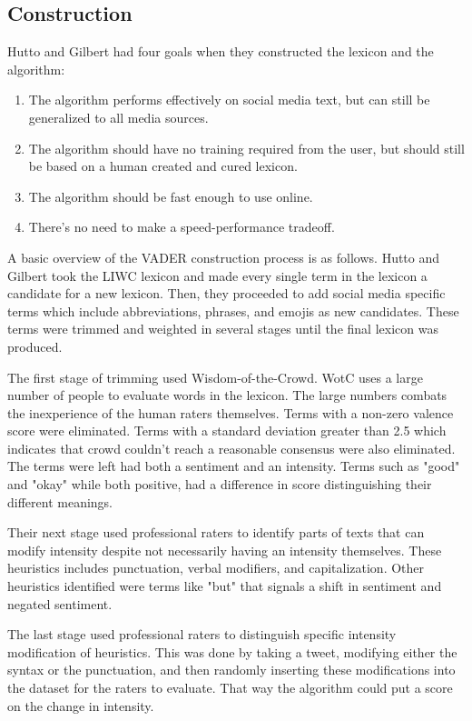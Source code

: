 \documentclass[11pt, twoside, reqno]{article}
\begin{document}
\subsection{Construction}
\hspace{0.2in}Hutto and Gilbert had four goals when they constructed the lexicon and the algorithm:
\begin{enumerate}
	\item The algorithm performs effectively on social media text, but can still be generalized to all media sources. 
	\item The algorithm should have no training required from the user, but should still be based on a human created and cured lexicon. 
	\item The algorithm should be fast enough to use online.
	\item There's no need to make a speed-performance tradeoff. 
\end{enumerate}

A basic overview of the VADER construction process is as follows. Hutto and Gilbert took the LIWC lexicon and made every single term in the lexicon a candidate for a new lexicon. Then, they proceeded to add social media specific terms which include abbreviations, phrases, and emojis as new candidates. These terms were trimmed and weighted in several stages until the final lexicon was produced. 

The first stage of trimming used Wisdom-of-the-Crowd. WotC uses a large number of people to evaluate words in the lexicon. The large numbers combats the inexperience of the human raters themselves. Terms with a non-zero valence score were eliminated. Terms with a standard deviation greater than 2.5 which indicates that crowd couldn't reach a reasonable consensus were also eliminated. The terms were left had both a sentiment and an intensity. Terms such as "good" and "okay" while both positive, had a difference in score distinguishing their different meanings. 

Their next stage used professional raters to identify parts of texts that can modify intensity despite not necessarily having an intensity themselves. These heuristics includes punctuation, verbal modifiers, and capitalization. Other heuristics identified were terms like "but" that signals a shift in sentiment and negated sentiment. 

The last stage used professional raters to distinguish specific intensity modification of heuristics. This was done by taking a tweet, modifying either the syntax or the punctuation, and then randomly inserting these modifications into the dataset for the raters to evaluate. That way the algorithm could put a score on the change in intensity. 
\end{document}

